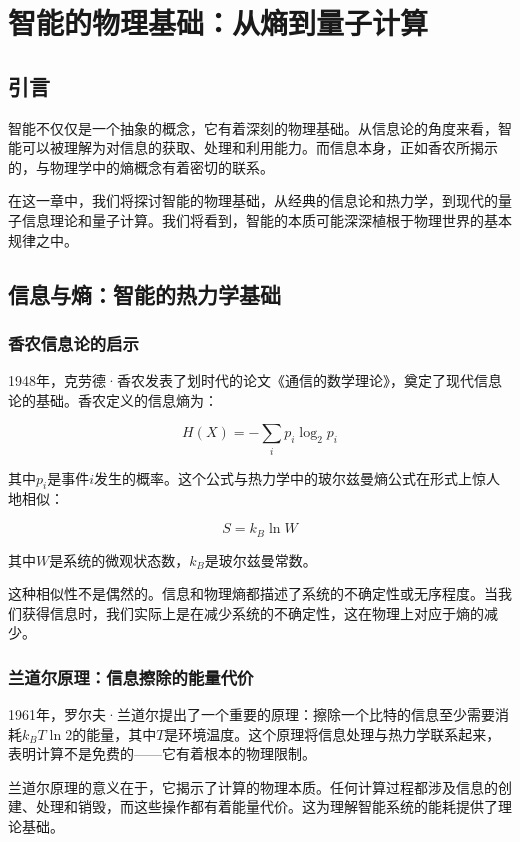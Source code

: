 \chapter{智能的物理基础：从熵到量子计算}

\section{引言}

智能不仅仅是一个抽象的概念，它有着深刻的物理基础。从信息论的角度来看，智能可以被理解为对信息的获取、处理和利用能力。而信息本身，正如香农所揭示的，与物理学中的熵概念有着密切的联系。

在这一章中，我们将探讨智能的物理基础，从经典的信息论和热力学，到现代的量子信息理论和量子计算。我们将看到，智能的本质可能深深植根于物理世界的基本规律之中。

\section{信息与熵：智能的热力学基础}

\subsection{香农信息论的启示}

1948年，克劳德·香农发表了划时代的论文《通信的数学理论》，奠定了现代信息论的基础。香农定义的信息熵为：

$$H(X) = -\sum_{i} p_i \log_2 p_i$$

其中$p_i$是事件$i$发生的概率。这个公式与热力学中的玻尔兹曼熵公式在形式上惊人地相似：

$$S = k_B \ln W$$

其中$W$是系统的微观状态数，$k_B$是玻尔兹曼常数。

这种相似性不是偶然的。信息和物理熵都描述了系统的不确定性或无序程度。当我们获得信息时，我们实际上是在减少系统的不确定性，这在物理上对应于熵的减少。

\subsection{兰道尔原理：信息擦除的能量代价}

1961年，罗尔夫·兰道尔提出了一个重要的原理：擦除一个比特的信息至少需要消耗$k_B T \ln 2$的能量，其中$T$是环境温度。这个原理将信息处理与热力学联系起来，表明计算不是免费的——它有着根本的物理限制。

兰道尔原理的意义在于，它揭示了计算的物理本质。任何计算过程都涉及信息的创建、处理和销毁，而这些操作都有着能量代价。这为理解智能系统的能耗提供了理论基础。

